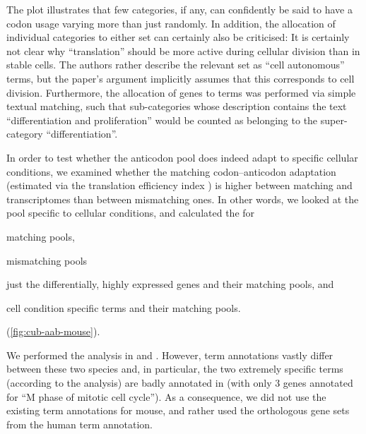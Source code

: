 The plot illustrates that few \go categories, if any, can confidently be said to
have a codon usage varying more than just randomly. In addition, the allocation
of individual \go categories to either set can certainly also be criticised: It
is certainly not clear why “translation” should be more active during cellular
division than in stable cells. The authors rather describe the relevant set as
“cell autonomous” \go terms, but the paper’s argument implicitly assumes that
this corresponds to cell division. Furthermore, the allocation of genes to \go
terms was performed via simple textual matching, such that \go sub-categories
whose description contains the text “differentiation and proliferation” would be
counted as belonging to the \go super-category “differentiation”.

In order to test whether the anticodon pool does indeed adapt to specific
cellular conditions, we examined whether the matching codon--anticodon
adaptation (estimated via the translation efficiency index \tai) is higher
between matching \mrna and \trna transcriptomes than between mismatching ones.
In other words, we looked at the \mrna pool specific to cellular conditions, and
calculated the \tai[s] for
\begin{enumerate*}
    \item matching \trna pools,
    \item mismatching \trna pools
    \item just the differentially, highly expressed \mrna genes and their
        matching \trna pools, and
    \item cell condition specific \go terms and their matching \trna pools.
\end{enumerate*}
(\cref{fig:cub-aab-mouse}).

We performed the analysis in \mmu and \hsa. However, \go term annotations vastly
differ between these two species and, in particular, the two extremely specific
\go terms (according to the \pca analysis) are badly annotated in \mmu (with
only \num{3} genes annotated for “M phase of mitotic cell cycle”). As a
consequence, we did not use the existing \go term annotations for mouse, and
rather used the orthologous gene sets from the human \go term annotation.

